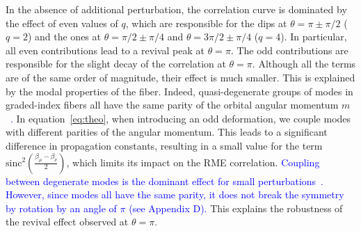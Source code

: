 \documentclass[aps,prl,twocolumn, amsmath,amssymb,superscriptaddress]{revtex4-2}
\newcommand{\red}[1]{\textcolor{red}{#1}}
\newcommand{\blue}[1]{\textcolor{blue}{#1}}
\begin{document}


In the absence of additional perturbation,
the correlation curve is dominated by the effect of even values of \(q\),
which are responsible for the dips at \(\theta = \pi \pm \pi/2\) (\(q = 2\))
and the ones at \(\theta = \pi/2 \pm \pi/4\) and \(\theta = 3\pi/2 \pm \pi/4\) (\(q = 4\)).
In particular, all even contributions lead to a revival peak at \(\theta = \pi\).
The odd contributions are responsible for the slight decay of the correlation at \(\theta=\pi\).
Although all the terms are of the same order of magnitude,
their effect is much smaller.
This is explained by the modal properties of the fiber.
Indeed, quasi-degenerate groups of modes in graded-index fibers all have the same parity
of the orbital angular momentum $m$
\blue{
~\cite{Olshansky1975mode}.
}
In equation~\ref{eq:theo},
when introducing an odd deformation,
we couple modes with different parities of the angular momentum.
This leads to a significant difference in propagation constants,
resulting in a small value for the term \(\text{sinc}^2\left(\frac{\beta_\mu-\beta_\nu}{2}\right)\),
which limits its impact on the RME correlation.
\blue{
Coupling between degenerate modes is the dominant effect for small perturbations~\cite{matthes2021learning}.
However, since modes all have the same parity,
it does not break the symmetry by rotation by an angle of $\pi$
(see Appendix D).
}
This explains the robustness of the revival effect observed at \(\theta = \pi\).\\
\end{document}
